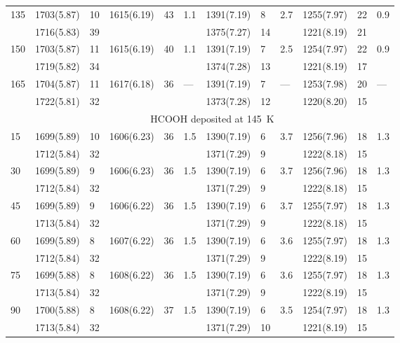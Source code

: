 \documentclass{aa}
\begin{document}
\begin{appendix}
\begin{table*}
\begin{center}
\begin{tabular}{l|lllll|lll|lll}
135          &  1703(5.87) & 10 & 1615(6.19) & 43 & 1.1 & 1391(7.19) &  8 & 2.7 & 1255(7.97) & 22 & 0.9\\ 
             & 	1716(5.83) & 39 &            &    &     & 1375(7.27) & 14 &     & 1221(8.19) & 21 &    \\
150          &  1703(5.87) & 11 & 1615(6.19) & 40 & 1.1 & 1391(7.19) &  7 & 2.5 & 1254(7.97) & 22 & 0.9\\
             & 	1719(5.82) & 34 &            &    &     & 1374(7.28) & 13 &     & 1221(8.19) & 17 &    \\
165          & 	1704(5.87) & 11 & 1617(6.18) & 36 & --- & 1391(7.19) &  7 & --- & 1253(7.98) & 20 & ---\\
             &  1722(5.81) & 32 &            &    &     & 1373(7.28) & 12 &     & 1220(8.20) & 15 &    \\
\hline
 & \multicolumn{11}{c}{HCOOH deposited at 145~K}\\
\hline
15           & 1699(5.89) &10 & 1606(6.23) & 36 & 1.5 & 1390(7.19) & 6 & 3.7 &1256(7.96) & 18 & 1.3\\
             & 1712(5.84) &32 &            &    &     & 1371(7.29) & 9 &     &1222(8.18) & 15 &    \\
30           & 1699(5.89) & 9 & 1606(6.23) & 36 & 1.5 & 1390(7.19) & 6 & 3.7 &1256(7.96) & 18 & 1.3\\
             & 1712(5.84) &32 &            &    &     & 1371(7.29) & 9 &     &1222(8.18) & 15 &    \\
45           & 1699(5.89) & 9 & 1606(6.22) & 36 & 1.5 & 1390(7.19) & 6 & 3.7 &1255(7.97) & 18 & 1.3\\
             & 1713(5.84) &32 &            &    &     & 1371(7.29) & 9 &     &1222(8.18) & 15 &    \\
60           & 1699(5.89) & 8 & 1607(6.22) & 36 & 1.5 & 1390(7.19) & 6 & 3.6 &1255(7.97) & 18 & 1.3\\
             & 1712(5.84) &32 &            &    &     & 1371(7.29) & 9 &     &1222(8.19) & 15 &    \\
75           & 1699(5.88) & 8 & 1608(6.22) & 36 & 1.5 & 1390(7.19) & 6 & 3.6 &1255(7.97) & 18 & 1.3\\
             & 1713(5.84) &32 &            &    &     & 1371(7.29) & 9 &     &1222(8.19) & 15 &    \\
90           & 1700(5.88) & 8 & 1608(6.22) & 37 & 1.5 & 1390(7.19) & 6 & 3.5 &1254(7.97) & 18 & 1.3\\
             & 1713(5.84) &32 &            &    &     & 1371(7.29) &10 &     &1221(8.19) & 15 &    \\

\end{tabular}
\end{center}
\end{table*}
\end{appendix}
\end{document}
